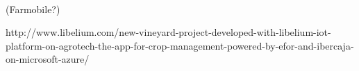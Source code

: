 \documentclass[../../memoria.tex]{subfiles}
\begin{document}
\paragraph{}
(Farmobile?)

http://www.libelium.com/new-vineyard-project-developed-with-libelium-iot-platform-on-agrotech-the-app-for-crop-management-powered-by-efor-and-ibercaja-on-microsoft-azure/
\end{document}
